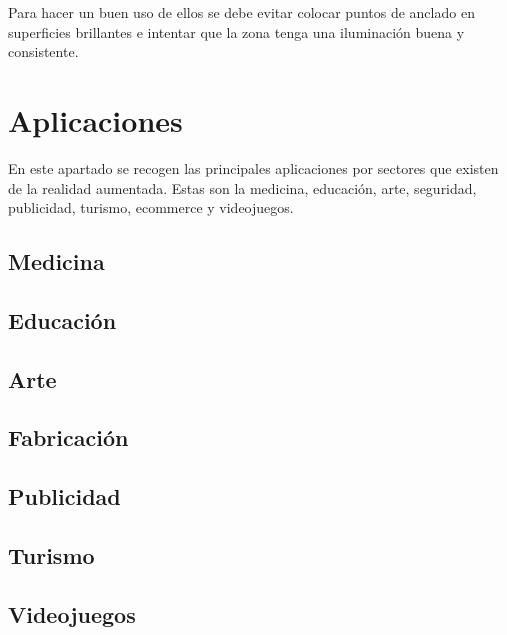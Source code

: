 Para hacer un buen uso de ellos se debe evitar colocar puntos de anclado en superficies brillantes e intentar que la zona tenga una iluminación buena y consistente.

\section{Aplicaciones}
En este apartado se recogen las principales aplicaciones por sectores que existen de la realidad aumentada. Estas son la medicina, educación, arte, seguridad, publicidad, turismo, ecommerce y videojuegos.
\subsection{Medicina}
\cite{ARGames_Gamification}
\subsection{Educación}
\subsection{Arte}
\subsection{Fabricación}
\subsection{Publicidad}
\subsection{Turismo}
\subsection{Videojuegos}
